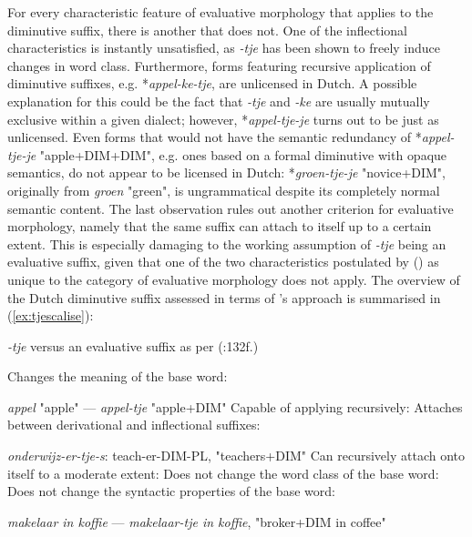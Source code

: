 For every characteristic feature of evaluative morphology that applies to the diminutive suffix, there is another that does not. One of the inflectional characteristics is instantly unsatisfied, as \textit{-tje} has been shown to freely induce changes in word class. Furthermore, forms featuring recursive application of diminutive suffixes, e.g. *\textit{appel-ke-tje}, are unlicensed in Dutch. A possible explanation for this could be the fact that \textit{-tje} and \textit{-ke} are usually mutually exclusive within a given dialect; however, *\textit{appel-tje-je} turns out to be just as unlicensed. Even forms that would not have the semantic redundancy of *\textit{appel-tje-je} "apple+DIM+DIM", e.g. ones based on a formal diminutive with opaque semantics, do not appear to be licensed in Dutch: *\textit{groen-tje-je} "novice+DIM", originally from \textit{groen} "green", is ungrammatical despite its completely normal semantic content. The last observation rules out another criterion for evaluative morphology, namely that the same suffix can attach to itself up to a certain extent. This is especially damaging to the working assumption of \textit{-tje} being an evaluative suffix, given that one of the two characteristics postulated by \citeauthor{Scalise+1986} (\citeyear{Scalise+1986}) as unique to the category of evaluative morphology does not apply. The overview of the Dutch diminutive suffix assessed in terms of \citeauthor{Scalise+1986}'s approach is summarised in (\ref{ex:tjescalise}):

\begin{exe}
\ex \label{ex:tjescalise}
\textit{-tje} versus an evaluative suffix as per \citeauthor{Scalise+1986} (\citeyear{Scalise+1986}:132f.)
\begin{xlist}
\ex \label{ex:tjescalisea}
Changes the meaning of the base word: \cmark \par
\textit{appel} "apple" --- \textit{appel-tje} "apple+DIM"
\ex \label{ex:tjescaliseb}
Capable of applying recursively: \xmark
\ex \label{ex:tjescalisec}
Attaches between derivational and inflectional suffixes: \cmark \par
\textit{onderwijz-er-tje-s}: teach-er-DIM-PL, "teachers+DIM"
\ex \label{ex:tjescalised}
Can recursively attach onto itself to a moderate extent: \xmark
\ex \label{ex:tjescalisee}
Does not change the word class of the base word: \xmark
\ex \label{ex:tjescalisef}
Does not change the syntactic properties of the base word: \cmark \par
\textit{makelaar in koffie} --- \textit{makelaar-tje in koffie}, "broker+DIM in coffee"
\end{xlist}
\end{exe}

